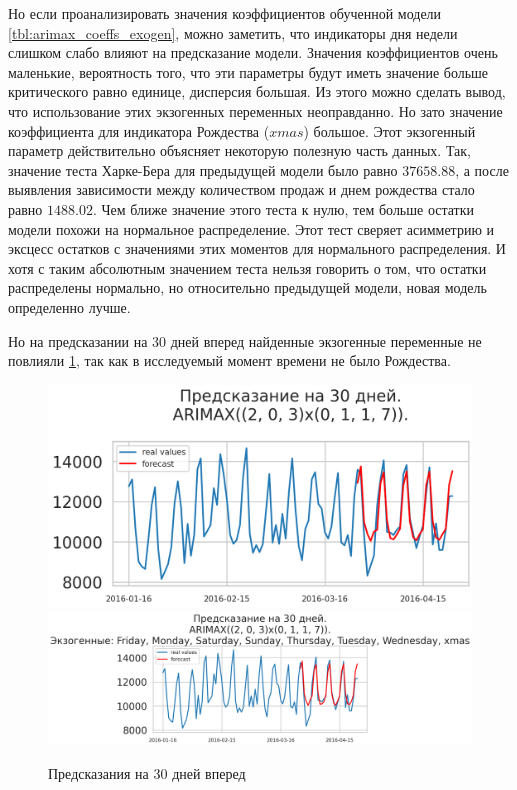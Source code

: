 Но если проанализировать значения коэффициентов обученной модели \ref{tbl:arimax_coeffs_exogen},
можно заметить, что индикаторы дня недели слишком слабо влияют на предсказание модели.
Значения коэффициентов очень маленькие, вероятность того, что эти параметры будут иметь
значение больше критического равно единице, дисперсия большая. Из этого можно сделать вывод,
что использование этих экзогенных переменных неоправданно. Но зато значение коэффициента
для индикатора Рождества ($ xmas $) большое. Этот экзогенный параметр
действительно объясняет некоторую полезную часть данных. Так, значение теста Харке-Бера
для предыдущей модели было равно $ 37658.88 $, а после выявления зависимости между количеством продаж
и днем рождества стало равно $ 1488.02 $. Чем ближе значение этого теста к нулю, тем больше остатки
модели похожи на нормальное распределение. Этот тест сверяет асимметрию и эксцесс остатков с
значениями этих моментов для нормального распределения. И хотя с таким абсолютным значением
теста нельзя говорить о том, что остатки распределены нормально, но относительно предыдущей
модели, новая модель определенно лучше.

Но на предсказании на 30 дней вперед найденные экзогенные переменные не повлияли \ref{img:arimax_forecast},
так как в исследуемый момент времени не было Рождества.

\def\figurename{Рис}
\begin{figure}[t]
	\centering
	\includegraphics[width=0.9\columnwidth]{./img/arimax_simple_pred30.png}
	\includegraphics[width=0.9\columnwidth]{./img/arimax_with_exog_pred30.png}
	\caption{Предсказания на 30 дней вперед}
	\label{img:arimax_forecast}
\end{figure}

